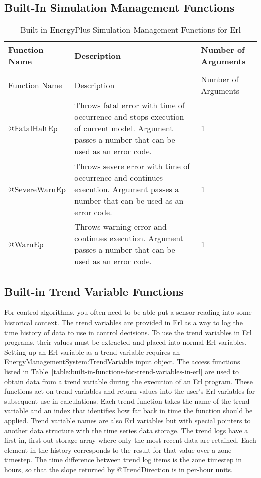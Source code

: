 \subsection{Built-In Simulation Management Functions}\label{built-in-simulation-management-functions}

\begin{longtable}[c]{p{1.5in}p{3.0in}p{1.5in}}
\caption{Built-in EnergyPlus Simulation Management Functions for Erl \label{table:built-in-energyplus-simulation-management}} \tabularnewline
\toprule
Function Name & Description & Number of Arguments \tabularnewline
\midrule
\endfirsthead

\caption[]{Built-in EnergyPlus Simulation Management Functions for Erl} \tabularnewline
\toprule
Function Name & Description & Number of Arguments \tabularnewline
\midrule
\endhead

@FatalHaltEp & Throws fatal error with time of occurrence and stops execution of current model. Argument passes a number that can be used as an error code. & 1 \tabularnewline
@SevereWarnEp & Throws severe error with time of occurrence and continues execution. Argument passes a number that can be used as an error code. & 1 \tabularnewline
@WarnEp & Throws warning error and continues execution. Argument passes a number that can be used as an error code. & 1 \tabularnewline
\bottomrule
\end{longtable}

\subsection{Built-in Trend Variable Functions}\label{built-in-trend-variable-functions}

For control algorithms, you often need to be able put a sensor reading into some historical context. The trend variables are provided in Erl as a way to log the time history of data to use in control decisions. To use the trend variables in Erl programs, their values must be extracted and placed into normal Erl variables. Setting up an Erl variable as a trend variable requires an EnergyManagementSystem:TrendVariable input object. The access functions listed in Table~\ref{table:built-in-functions-for-trend-variables-in-erl} are used to obtain data from a trend variable during the execution of an Erl program. These functions act on trend variables and return values into the user's Erl variables for subsequent use in calculations. Each trend function takes the name of the trend variable and an index that identifies how far back in time the function should be applied. Trend variable names are also Erl variables but with special pointers to another data structure with the time series data storage. The trend logs have a first-in, first-out storage array where only the most recent data are retained. Each element in the history corresponds to the result for that value over a zone timestep. The time difference between trend log items is the zone timestep in hours, so that the slope returned by @TrendDirection is in per-hour units.

